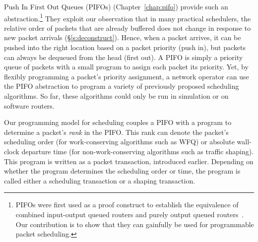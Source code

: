  Push In First Out Queues (PIFOs) (Chapter~\ref{chap:pifo}) provide such an
abstraction.\footnote{PIFOs were first used as a proof construct to establish
the equivalence of combined input-output queued routers and purely output
queued routers~\cite{pifo}. Our contribution is to show that they can gainfully
be used for programmable packet scheduling.} They exploit our observation that
in many practical schedulers, the relative order of packets that are already
buffered does not change in response to new packet arrivals
(\S\ref{s:deconstruct}). Hence, when a packet arrives, it can be pushed into
the right location based on a packet priority (push in), but packets can always
be dequeued from the head (first out). A PIFO is simply a
priority queue of packets with a small program to assign each packet its
priority. Yet, by flexibly programming a packet's priority assignment, a
network operator can use the PIFO abstraction to program a variety of
previously proposed scheduling algorithms. So far, these algorithms could only
be run in simulation or on software routers.

 Our programming model for
scheduling couples a PIFO with a program to determine a packet's {\em rank} in
the PIFO. This rank can denote the packet's scheduling order (for
work-conserving algorithms such as WFQ) or absolute wall-clock departure time
(for non-work-conserving algorithms such as traffic shaping). This program is
written as a packet transaction, introduced earlier.  Depending on whether the
program determines the scheduling order or time, the program is called either a
scheduling transaction or a shaping transaction.

